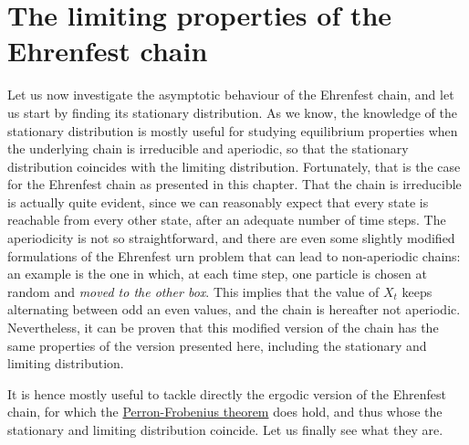 \section{The limiting properties of the Ehrenfest chain}
Let us now investigate the asymptotic behaviour of the Ehrenfest chain, and let us start by finding its stationary distribution. As we know, the knowledge of the stationary distribution is mostly useful for studying equilibrium properties when the underlying chain is irreducible and aperiodic, so that the stationary distribution coincides with the limiting distribution. Fortunately, that is the case for the Ehrenfest chain as presented in this chapter. That the chain is irreducible is actually quite evident, since we can reasonably expect that every state is reachable from every other state, after an adequate number of time steps. The aperiodicity is not so straightforward, and there are even some slightly modified formulations of the Ehrenfest urn problem that can lead to non-aperiodic chains: an example is the one in which, at each time step, one particle is chosen at random and \emph{moved to the other box}. This implies that the value of $X_t$ keeps alternating between odd an even values, and the chain is hereafter not aperiodic. Nevertheless, it can be proven that this modified version of the chain has the same properties of the version presented here, including the stationary and limiting distribution. 

It is hence mostly useful to tackle directly the ergodic version of the Ehrenfest chain, for which the \hyperref[th:perron-frobenius] {Perron-Frobenius theorem} does hold, and thus whose the stationary and limiting distribution coincide. Let us finally see what they are.

